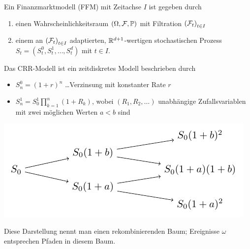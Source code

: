 \begin{definition}
	Ein Finanzmarktmodell (FFM) mit Zeitachse $I$ ist gegeben durch
	\begin{enumerate}[nolistsep, topsep=-\parskip]
		\item einen Wahrscheinlichkeitsraum $(\Omega, \mathcal{F}, \mathbb{P})$ mit Filtration $\left( \mathcal{F}_t \right)_{t \in I}$
		\item einem an $\left( \mathcal{F}_t \right)_{t \in I}$ adaptierten, $\mathbb{R}^{d+1}$-wertigen stochastischen Prozess $S_t = (S_t^0, S_t^1 , \dots , S_t^d)$ mit $t \in I$.
	\end{enumerate}
\end{definition}
\begin{beispiel}
	Das CRR-Modell ist ein zeitdiskretes Modell beschrieben durch
	\begin{itemize}[nolistsep, topsep=-\parskip]
		\item $S_n^0 = (1+r)^n$ \dots Verzinsung mit konstanter Rate $r$
		\item $S_n^1 = S_0^1 \prod_{k=1}^n (1+R_k)$, wobei $(R_1, R_2, \dots)$ unabhängige Zufallsvariablen mit zwei möglichen Werten $a < b$ sind
	\end{itemize}

	\begin{center}
		\includegraphics[width=.5\textwidth]{./img/crr-baum}
	\end{center}	

	Diese Darstellung nennt man einen rekombinierenden Baum; Ereignisse $\omega$ entsprechen Pfaden in diesem Baum.
\end{beispiel}


